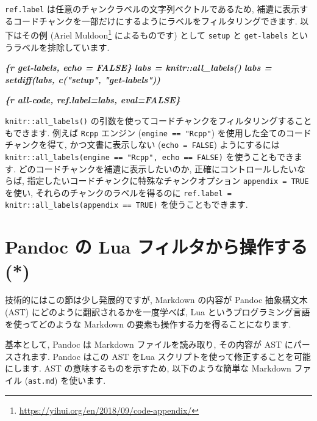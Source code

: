 \documentclass[
  11pt,
]{bxjsreport}
\newenvironment{Shaded}{\begin{snugshade}}{\end{snugshade}}
\newcommand{\InformationTok}[1]{\textcolor[rgb]{0.56,0.35,0.01}{\textbf{\textit{#1}}}}
\renewcommand{\href}[2]{#2\footnote{\url{#1}}}
\begin{document}
\texttt{ref.label} は任意のチャンクラベルの文字列ベクトルであるため, 補遺に表示するコードチャンクを一部だけにするようにラベルをフィルタリングできます. 以下はその例 (\href{https://yihui.org/en/2018/09/code-appendix/}{Ariel Muldoon} によるものです) として \texttt{setup} と \texttt{get-labels} というラベルを排除しています.

\begin{Shaded}
\begin{Highlighting}[]
\InformationTok{\textasciigrave{}\textasciigrave{}\textasciigrave{}\{r get{-}labels, echo = FALSE\}}
\InformationTok{labs = knitr::all\_labels()}
\InformationTok{labs = setdiff(labs, c("setup", "get{-}labels"))}
\InformationTok{\textasciigrave{}\textasciigrave{}\textasciigrave{}}

\InformationTok{\textasciigrave{}\textasciigrave{}\textasciigrave{}\{r all{-}code, ref.label=labs, eval=FALSE\}}
\InformationTok{\textasciigrave{}\textasciigrave{}\textasciigrave{}}
\end{Highlighting}
\end{Shaded}

\texttt{knitr::all\_labels()} の引数を使ってコードチャンクをフィルタリングすることもできます. 例えば \texttt{Rcpp} エンジン (\texttt{engine == "Rcpp"}) を使用した全てのコードチャンクを得て, かつ文書に表示しない (\texttt{echo = FALSE}) ようにするには \texttt{knitr::all\_labels(engine == "Rcpp", echo == FALSE)} を使うこともできます. どのコードチャンクを補遺に表示したいのか, 正確にコントロールしたいならば, 指定したいコードチャンクに特殊なチャンクオプション \texttt{appendix = TRUE} を使い, それらのチャンクのラベルを得るのに \texttt{ref.label = knitr::all\_labels(appendix == TRUE)} を使うこともできます.

\hypertarget{lua-filters}{%
\section{Pandoc の Lua フィルタから操作する (*)}\label{lua-filters}}


技術的にはこの節は少し発展的ですが, Markdown の内容が Pandoc 抽象構文木 (AST) にどのように翻訳されるかを一度学べば, Lua というプログラミング言語を使ってどのような Markdown の要素も操作する力を得ることになります.

基本として, Pandoc は Markdown ファイルを読み取り, その内容が AST にパースされます. Pandoc はこの AST をLua スクリプトを使って修正することを可能にします. AST の意味するものを示すため, 以下のような簡単な Markdown ファイル (\texttt{ast.md}) を使います.
\end{document}
